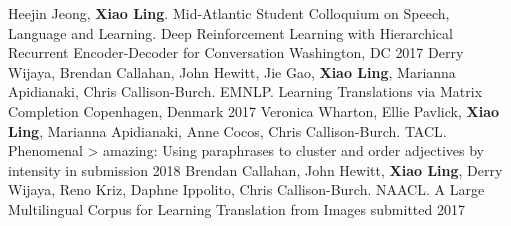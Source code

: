 
\begin{cventries}
  \cventrypublication
    {Heejin Jeong, \textbf{Xiao Ling}.  Mid-Atlantic Student Colloquium on Speech, Language and Learning.}
    {Deep Reinforcement Learning with Hierarchical Recurrent Encoder-Decoder for Conversation}
    {Washington, DC}
    {2017}
    {}
  \cventrypublication
    {Derry Wijaya, Brendan Callahan, John Hewitt, Jie Gao, \textbf{Xiao Ling}, Marianna Apidianaki, Chris Callison-Burch. EMNLP.}
    {Learning Translations via Matrix Completion}
    {Copenhagen, Denmark}
    {2017}
    {}
  \cventrypublication
    {Veronica Wharton, Ellie Pavlick, \textbf{Xiao Ling}, Marianna Apidianaki, Anne Cocos, Chris Callison-Burch. TACL.}
    {Phenomenal > amazing: Using paraphrases to cluster and order adjectives by intensity}
    {in submission}
    {2018}
    {}
  \cventrypublication
    {Brendan Callahan, John Hewitt, \textbf{Xiao Ling}, Derry Wijaya, Reno Kriz, Daphne Ippolito,  Chris Callison-Burch. NAACL.}
    {A Large Multilingual Corpus for Learning Translation from Images}
    {submitted}
    {2017}
    {}
\end{cventries}


